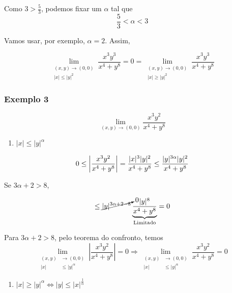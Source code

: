 \documentclass[
  portuguese,
  letterpaper,
  DIV=11,
  numbers=noendperiod]{scrreport}
\providecommand{\tightlist}{%
  \setlength{\itemsep}{0pt}\setlength{\parskip}{0pt}}
\begin{document}
Como \(3 > \frac{5}{3}\), podemos fixar um \(\alpha\) tal que \[
\frac{5}{3} < \alpha < 3
\]

Vamos usar, por exemplo, \(\alpha = 2\). Assim,

\[
\lim_{\begin{aligned}(x,y)\rightarrow (0,0)
\\ \lvert x \rvert \leq \lvert y \rvert^{2}
\end{aligned}} \frac{x^3y^3}{x^4+y^8} = 0 = 
\lim_{\begin{aligned}(x,y)\rightarrow (0,0)
\\ \lvert x \rvert \geq \lvert y \rvert^{2}
\end{aligned}} \frac{x^3y^3}{x^4+y^8}
\]

\subsubsection{Exemplo 3}\label{exemplo-3}

\[
\lim_{(x,y)\rightarrow(0,0)} \frac{x^3y^2}{x^4+y^8}
\]

\begin{enumerate}
\def\labelenumi{\arabic{enumi}.}
\tightlist
\item
  \(\lvert x \rvert \leq \lvert y \rvert^{\alpha}\)
\end{enumerate}

\[
0 \leq \left\lvert\frac{x^3 y^2}{x^4+y^8} \right\rvert=
\frac{\lvert x \rvert^3 \lvert y \rvert^2}{x^4+y^8} \leq
\frac{\lvert y \rvert^{3\alpha} \lvert y \rvert^2}{x^4+y^8} \\
\]

Se \(3\alpha + 2 > 8\),

\[
\leq \cancelto{0}{\lvert y \rvert^{3\alpha+2-8}}
\underbrace{\frac{\lvert y \rvert^{8}}{x^4+y^8}}_{\text{Limitado}} = 0
\]

Para \(3\alpha + 2 > 8\), pelo teorema do confronto, temos \[
\lim_{\begin{aligned}(x,y)&\rightarrow (0,0) \\ 
\lvert x \rvert & \leq \lvert y \rvert^{\alpha} \end{aligned}}
\left\lvert \frac{x^3y^2}{x^4+y^8} \right\rvert = 0 \Rightarrow
\lim_{\begin{aligned}(x,y)&\rightarrow (0,0) \\ 
\lvert x \rvert & \leq \lvert y \rvert^{\alpha} \end{aligned}}
\frac{x^3y^2}{x^4+y^8} = 0
\]

\begin{enumerate}
\def\labelenumi{\arabic{enumi}.}
\setcounter{enumi}{1}
\tightlist
\item
  \(\lvert x \rvert \geq \lvert y \rvert^{\alpha} \Leftrightarrow \lvert y \rvert \leq \lvert x \rvert^{\frac{1}{\alpha}}\)
\end{enumerate}
\end{document}

